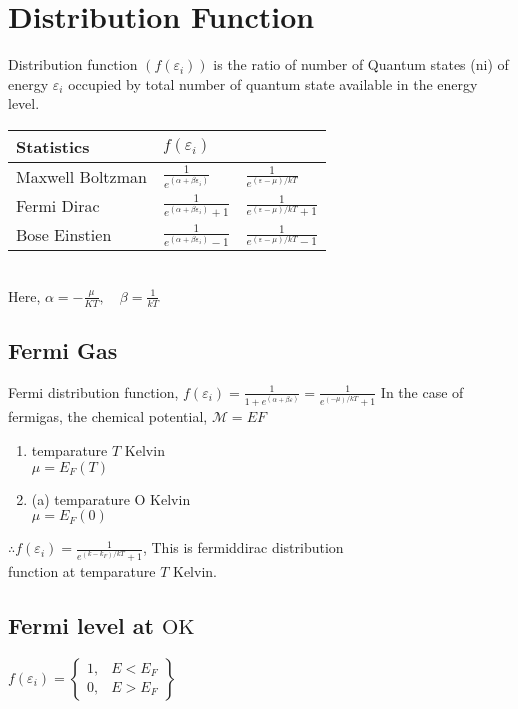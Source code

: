 \section{Distribution Function}
Distribution function $\left(f\left(\varepsilon_{i}\right)\right)$ is the ratio of number of Quantum states (ni) of energy $\varepsilon_{i}$ occupied by total number of quantum state available in the energy level.\\
\renewcommand*{\arraystretch}{2}
\begin{tabular}{|p{3cm}|p{3cm}|p{3cm}|}
	\hline
	Statistics&$f\left(\varepsilon_{i}\right)$& \\\hline
	Maxwell Boltzman&$\frac{1}{e^{\left(\alpha+\beta \varepsilon_{i}\right)}}$& $\frac{1}{e^{(\varepsilon-\mu) / k T}}$\\\hline
	Fermi Dirac&$\frac{1}{e^{\left(\alpha+\beta \varepsilon_{i}\right)}+1}$&$\frac{1}{e^{(\varepsilon-\mu) / k T}+1}$\\\hline
	Bose Einstien &$\frac{1}{e^{\left(\alpha+\beta \varepsilon_{i}\right)}-1}$&$\frac{1}{e^{(\varepsilon-\mu) / k T}-1}$\\\hline
\end{tabular}\\
Here, $\alpha=-\frac{\mu}{K T}, \quad \beta=\frac{1}{k T}$
\subsection{Fermi Gas}
Fermi distribution function, $f\left(\varepsilon_{i}\right)=\frac{1}{1+e^{(\alpha+\beta \varepsilon)}}=\frac{1}{e^{(-\mu) / k T}+1}$ In the case of fermigas, the chemical potential, $\mathcal{M}=E F$
\begin{enumerate}[label=\roman*)]
	\item temparature $T$ Kelvin\\
	$\mu=E_{F}(T)$
	\item (a) temparature O Kelvin\\
	$
	\mu=E_{F}(0)
	$
\end{enumerate}
$\therefore f\left(\varepsilon_{i}\right)=\frac{1}{e^{\left(k-k_{F}\right) / k T}+1}$, This is fermiddirac distribution\\
function at temparature $T$ Kelvin.
\subsection{Fermi level at $\mathrm{OK}$}
$f\left(\varepsilon_{i}\right)=\left\{\begin{array}{ll}1, & E<E_{F} \\ 0, & E>E_{F}\end{array}\right\}$

